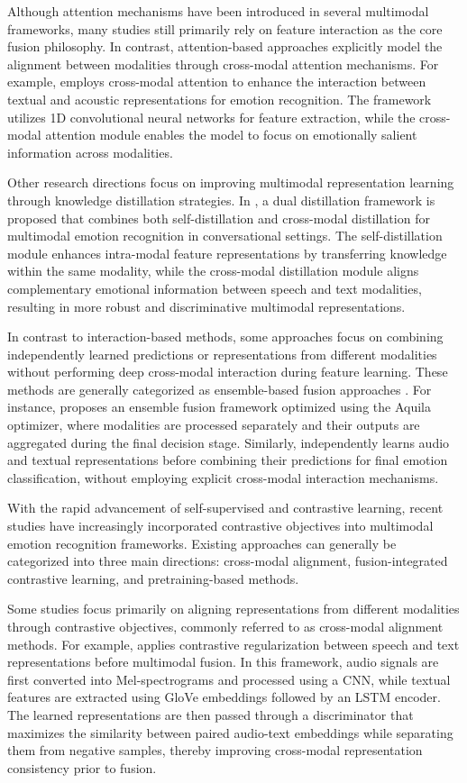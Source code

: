 Although attention mechanisms have been introduced in several multimodal frameworks, many studies still primarily rely on feature interaction as the core fusion philosophy. In contrast, attention-based approaches explicitly model the alignment between modalities through cross-modal attention mechanisms. For example,\cite{Krishna2020} employs cross-modal attention to enhance the interaction between textual and acoustic representations for emotion recognition. The framework utilizes 1D convolutional neural networks for feature extraction, while the cross-modal attention module enables the model to focus on emotionally salient information across modalities.

Other research directions focus on improving multimodal representation learning through knowledge distillation strategies. In \cite{KIM2026}, a dual distillation framework is proposed that combines both self-distillation and cross-modal distillation for multimodal emotion recognition in conversational settings. The self-distillation module enhances intra-modal feature representations by transferring knowledge within the same modality, while the cross-modal distillation module aligns complementary emotional information between speech and text modalities, resulting in more robust and discriminative multimodal representations.

In contrast to interaction-based methods, some approaches focus on combining independently learned predictions or representations from different modalities without performing deep cross-modal interaction during feature learning. These methods are generally categorized as ensemble-based fusion approaches \cite{PAYALA2026, Sebastian2019}. For instance,\cite{Sebastian2019} proposes an ensemble fusion framework optimized using the Aquila optimizer, where modalities are processed separately and their outputs are aggregated during the final decision stage. Similarly, \cite{PAYALA2026} independently learns audio and textual representations before combining their predictions for final emotion classification, without employing explicit cross-modal interaction mechanisms.

With the rapid advancement of self-supervised and contrastive learning, recent studies have increasingly incorporated contrastive objectives into multimodal emotion recognition frameworks. Existing approaches can generally be categorized into three main directions: cross-modal alignment, fusion-integrated contrastive learning, and pretraining-based methods.

Some studies focus primarily on aligning representations from different modalities through contrastive objectives, commonly referred to as cross-modal alignment methods. For example,\cite{qian2022} applies contrastive regularization between speech and text representations before multimodal fusion. In this framework, audio signals are first converted into Mel-spectrograms and processed using a CNN, while textual features are extracted using GloVe embeddings followed by an LSTM encoder. The learned representations are then passed through a discriminator that maximizes the similarity between paired audio-text embeddings while separating them from negative samples, thereby improving cross-modal representation consistency prior to fusion.

